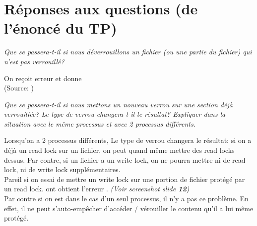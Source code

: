 %
\section{Réponses aux questions (de l'énoncé du TP)}
\begin{frame}{\secname}

\vspace{-0.7cm}
\begin{enumerate}
    {\footnotesize 
    \item  \emph{Que se passera-t-il si nous déverrouillons un fichier (ou une partie du fichier) qui n’est pas verrouillé?}
    \begin{itemize}
       { \footnotesize 
       \item  On reçoit erreur 
        et  donne\\
          (Source: )}
        
    \end{itemize}

\vspace{0.2cm}
   \item \emph{Que se passera-t-il si nous mettons un nouveau verrou sur une section déjà verrouillée? Le type de verrou changera t-il le résultat? Expliquer dans la situation avec le même processus et avec 2 processus différents.}\\
   
    \begin{itemize}
    { \footnotesize 
        \item  Lorsqu'on a 2 processus différents,
  Le type de verrou changera le résultat: si on a déjà un read lock sur un fichier, on peut quand même mettre des read locks dessus. Par contre, si un fichier a un write lock, on ne pourra mettre ni de read lock, ni de write lock supplémentaires.\\
  Pareil si on essai de mettre un write lock sur une portion de fichier protégé par un read lock.
  ont obtient l'erreur . \textit{(Voir screenshot slide \textbf{12})}\\   
  
  Par contre si on est dans le cas d'un seul processus, il n'y a pas ce problème. En effet, il ne peut s'auto-empêcher d'accéder / vérouiller le contenu qu'il a lui même protégé.}
    \end{itemize}}
   
\end{enumerate}

\end{frame}

